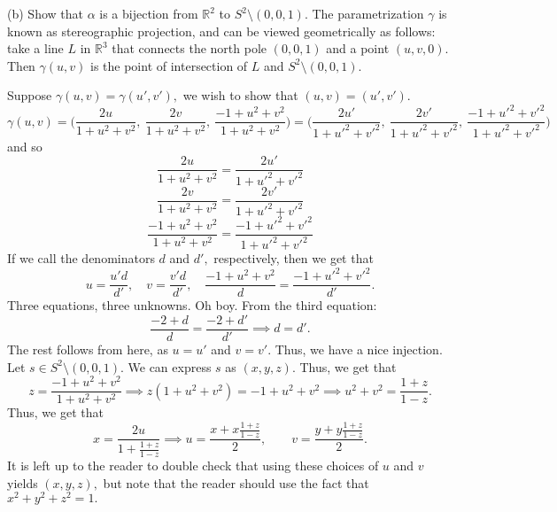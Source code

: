 \documentclass[11pt]{article}
\newcommand{\bbR}{\mathbb{R}}
\newcommand{\sm}{\setminus}
\begin{document}
\begin{itemize}
\begin{problem}
\item[(b)] Show that $\alpha$ is a bijection from $\mathbb{R}^2$ to $S^2\setminus(0,0,1)$. The parametrization $\gamma$ is known as stereographic
projection, and can be viewed geometrically as follows: take a line $L$ in $\bbR^3$ that connects the north pole $(0,0,1)$ and a point $(u,v,0)$. Then $\gamma(u,v)$ is the point of intersection of $L$ and $S^2\setminus(0,0,1)$.
\end{problem}
\begin{solution}
    Suppose $\gamma(u,v) = \gamma(u', v'),$ we wish to show that $(u,v) = (u',v').$
        \[\gamma(u,v) = \bigg(\frac{2u}{1+u^2+v^2},\:\frac{2v}{1+u^2+v^2},\:\frac{-1+u^2+v^2}
{1+u^2+v^2}\bigg) = \bigg(\frac{2u'}{1+u'^2+v'^2},\:\frac{2v'}{1+u'^2+v'^2},\:\frac{-1+u'^2+v'^2}
{1+u'^2+v'^2}\bigg)\] and so
\[\frac{2u}{1+u^2+v^2} = \frac{2u'}{1+u'^2+v'^2}\]
\[\frac{2v}{1+u^2+v^2} = \frac{2v'}{1+u'^2+v'^2}\]
\[\frac{-1+u^2+v^2}
{1+u^2+v^2} = \frac{-1+u'^2+v'^2}
{1+u'^2+v'^2}\] If we call the denominators $d$ and $d',$ respectively, then we get that 
\[u = \frac{u'd}{d'}, \quad v = \frac{v'd}{d'}, \quad \frac{-1+u^2+v^2}
{d} = \frac{-1+u'^2+v'^2}
{d'}.\]
Three equations, three unknowns. Oh boy. From the third equation:
\[\frac{-2 + d}{d}= \frac{-2 + d'}{d'} \implies d = d'.\] The rest follows from here, as $u = u'$ and $v = v'.$ Thus, we have a nice injection.\\

Let $s \in S^2\sm (0,0,1).$ We can express $s$ as $(x,y,z).$ Thus, we get that 
\[z = \frac{-1 + u^2 +v^2}{1 + u^2 + v^2}\implies z(1 + u^2 + v^2) = -1 + u^2 + v^2 \implies u^2 + v^2 = \frac{1+z}{1 -z}.\]
Thus, we get that 
\[x = \frac{2u}{1 + \frac{1+z}{1-z}} \implies u = \frac{x + x\frac{1+z}{1-z}}{2}, \qquad v = \frac{y + y\frac{1+z}{1-z}}{2}.\] It is left up to the reader to double check that using these choices of $u$ and $v$ yields $(x,y,z),$ but note that the reader should use the fact that $x^2 + y^2 + z^2 =1.$
\end{solution}
\begin{problem}
    

\end{problem}
\end{itemize}
\end{document}
